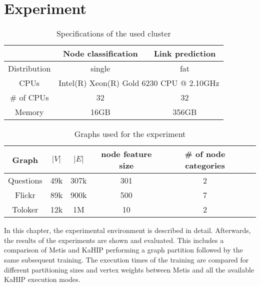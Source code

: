 \documentclass[acmsmall,nonacm,screen,review]{acmart}
\begin{document}
\section{Experiment}
\begin{table}[bt!]
\centering
\begin{tabular}{ ccc }
 \centering
  & Node classification & Link prediction \\ 
 \hline
 Distribution & single & fat \\
 CPUs & \multicolumn{2}{c}{Intel(R) Xeon(R) Gold 6230 CPU @ 2.10GHz} \\ 
 \# of CPUs & 32 & 32 \\ 
 Memory & 16GB & 356GB \\
\end{tabular}
\caption{Specifications of the used cluster}
\label{hw}
\end{table}
\begin{table}[bt!]
\centering
\begin{tabular}{ cccccc }
 \centering
 Graph & $|V|$ & $|E|$ & node feature size & \# of node categories \\ 
 \hline
 Questions \cite{TQ} & 49k & 307k & 301 & 2 \\ 
 Flickr \cite{Flickr} & 89k & 900k & 500 & 7\\ 
 Toloker \cite{TQ,Tolokers} & 12k & 1M & 10 & 2 \\

\end{tabular}
\caption{Graphs used for the experiment}
\label{graphs}
\end{table}
In this chapter, the experimental environment is described in detail. Afterwards, the results of the experiments are shown and evaluated. This includes a comparison of Metis and KaHIP performing a graph partition followed by the same subsequent training. The execution times of the training are compared for different partitioning sizes and vertex weights between Metis and all the available KaHIP execution modes. 
\end{document}
